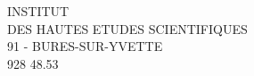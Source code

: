 \begin{center}
INSTITUT\\
DES HAUTES ETUDES SCIENTIFIQUES\\
91 - BURES-SUR-YVETTE\\
928 48.53
\end{center}
